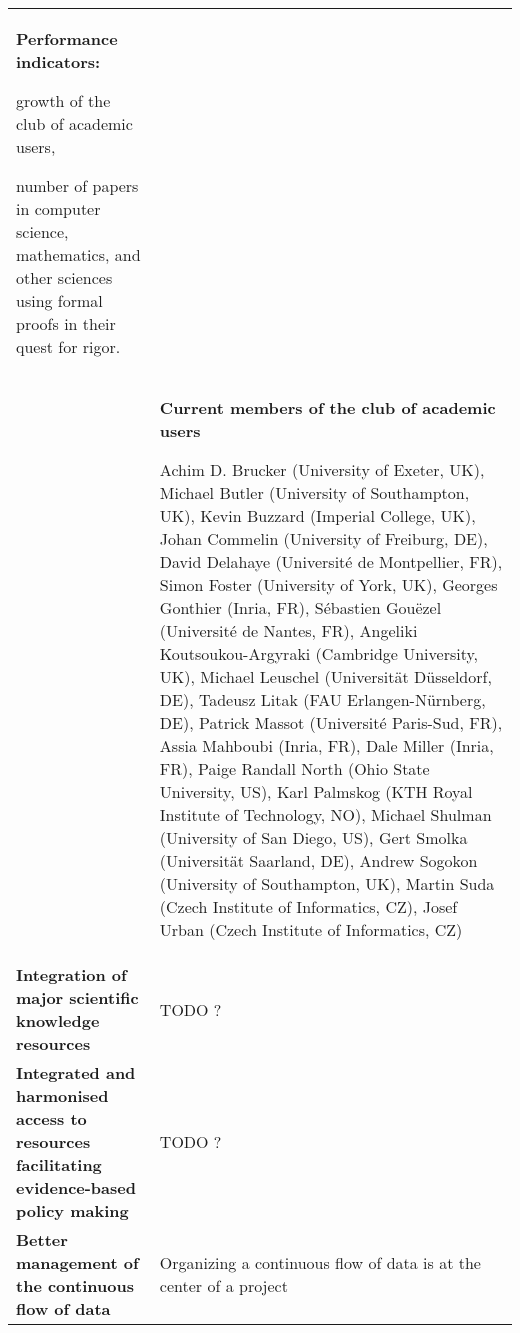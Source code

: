 \begin{longtable}{|p{}|p{}|}
\colorbox{color3}{\bf Performance indicators:}
\begin{compactitem}
\item growth of the club of academic users, 
\item number of papers in computer science, mathematics, and other sciences
using formal proofs in their quest for rigor.
\end{compactitem}
\\
&
\definecolor{shadecolor}{named}{color1}
\begin{shaded}
\begin{center}
  {\bf\large Current members of the club of academic users}
\end{center}
Achim D. Brucker (University of Exeter, UK),
Michael Butler (University of Southampton, UK),
Kevin Buzzard (Imperial College, UK),
Johan Commelin (University of Freiburg, DE),
David Delahaye (Université de Montpellier, FR),
Simon Foster (University of York, UK),
Georges Gonthier (Inria, FR),
Sébastien Gouëzel (Université de Nantes, FR),
Angeliki Koutsoukou-Argyraki (Cambridge University, UK),
Michael Leuschel (Universität Düsseldorf, DE),
Tadeusz Litak (FAU Erlangen-Nürnberg, DE),
Patrick Massot (Université Paris-Sud, FR),
Assia Mahboubi (Inria, FR),
Dale Miller (Inria, FR),
Paige Randall North (Ohio State University, US),
Karl Palmskog (KTH Royal Institute of Technology, NO),
Michael Shulman (University of San Diego, US),
Gert Smolka (Universität Saarland, DE),
Andrew Sogokon (University of Southampton, UK),
Martin Suda (Czech Institute of Informatics, CZ),
Josef Urban (Czech Institute of Informatics, CZ)
\end{shaded}
\\
\hline
{\bf Integration of major scientific knowledge resources}
&
{\color{red}TODO ?}
\\
\hline
{\bf Integrated and harmonised access to resources facilitating evidence-based policy making}
&
{\color{red}TODO ?}
\\
\hline
{\bf Better management of the continuous flow of data}
&
Organizing a continuous flow of data is at the center of a project

\end{longtable}
